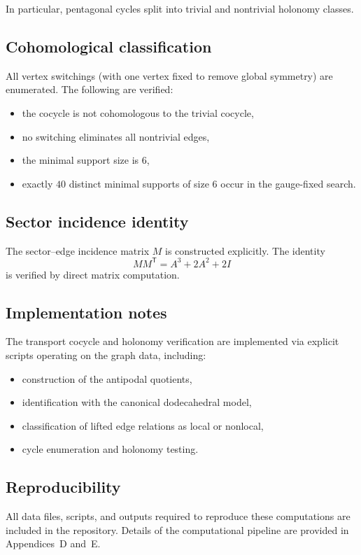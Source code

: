 In particular, pentagonal cycles split into trivial and nontrivial
holonomy classes.

\subsection{Cohomological classification}

All vertex switchings (with one vertex fixed to remove global symmetry)
are enumerated. The following are verified:
\begin{itemize}
\item the cocycle is not cohomologous to the trivial cocycle,
\item no switching eliminates all nontrivial edges,
\item the minimal support size is $6$,
\item exactly $40$ distinct minimal supports of size $6$ occur in the
gauge-fixed search.
\end{itemize}

\subsection{Sector incidence identity}

The sector--edge incidence matrix $M$ is constructed explicitly.
The identity
\[
MM^{\mathsf T} = A^3 + 2A^2 + 2I
\]
is verified by direct matrix computation.

\subsection{Implementation notes}

The transport cocycle and holonomy verification are implemented via
explicit scripts operating on the graph data, including:

\begin{itemize}
\item construction of the antipodal quotients,
\item identification with the canonical dodecahedral model,
\item classification of lifted edge relations as local or nonlocal,
\item cycle enumeration and holonomy testing.
\end{itemize}

\subsection{Reproducibility}

All data files, scripts, and outputs required to reproduce these
computations are included in the repository. Details of the computational
pipeline are provided in Appendices~D and~E.
